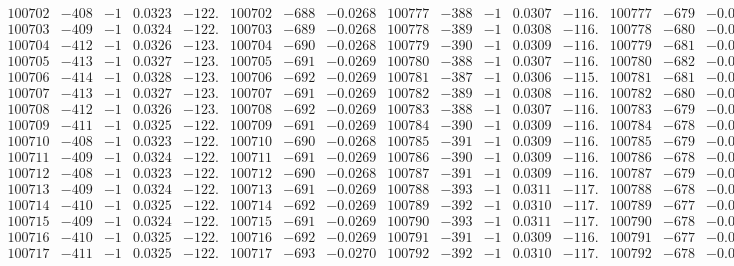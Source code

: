 \documentclass[11pt,reqno,a4letter]{article}
\numberwithin{figure}{section}
\numberwithin{table}{section}
\theoremstyle{plain}
\numberwithin{theorem}{section}
\theoremstyle{definition}
\begin{document}
\begin{table}[ht!]
\begin{equation*}
{\begin{array}{ccccc|ccc||ccccc|ccc}
100702 & -408 & -1 & 0.0323 & -122. & 100702 & -688 & -0.0268 & 100777 & -388 & -1 & 0.0307 & -116. & 100777 & -679 & -0.0264  \\
100703 & -409 & -1 & 0.0324 & -122. & 100703 & -689 & -0.0268 & 100778 & -389 & -1 & 0.0308 & -116. & 100778 & -680 & -0.0264  \\
100704 & -412 & -1 & 0.0326 & -123. & 100704 & -690 & -0.0268 & 100779 & -390 & -1 & 0.0309 & -116. & 100779 & -681 & -0.0265  \\
100705 & -413 & -1 & 0.0327 & -123. & 100705 & -691 & -0.0269 & 100780 & -388 & -1 & 0.0307 & -116. & 100780 & -682 & -0.0265  \\
100706 & -414 & -1 & 0.0328 & -123. & 100706 & -692 & -0.0269 & 100781 & -387 & -1 & 0.0306 & -115. & 100781 & -681 & -0.0265  \\
100707 & -413 & -1 & 0.0327 & -123. & 100707 & -691 & -0.0269 & 100782 & -389 & -1 & 0.0308 & -116. & 100782 & -680 & -0.0264  \\
100708 & -412 & -1 & 0.0326 & -123. & 100708 & -692 & -0.0269 & 100783 & -388 & -1 & 0.0307 & -116. & 100783 & -679 & -0.0264  \\
100709 & -411 & -1 & 0.0325 & -122. & 100709 & -691 & -0.0269 & 100784 & -390 & -1 & 0.0309 & -116. & 100784 & -678 & -0.0264  \\
100710 & -408 & -1 & 0.0323 & -122. & 100710 & -690 & -0.0268 & 100785 & -391 & -1 & 0.0309 & -116. & 100785 & -679 & -0.0264  \\
100711 & -409 & -1 & 0.0324 & -122. & 100711 & -691 & -0.0269 & 100786 & -390 & -1 & 0.0309 & -116. & 100786 & -678 & -0.0264  \\
100712 & -408 & -1 & 0.0323 & -122. & 100712 & -690 & -0.0268 & 100787 & -391 & -1 & 0.0309 & -116. & 100787 & -679 & -0.0264  \\
100713 & -409 & -1 & 0.0324 & -122. & 100713 & -691 & -0.0269 & 100788 & -393 & -1 & 0.0311 & -117. & 100788 & -678 & -0.0264  \\
100714 & -410 & -1 & 0.0325 & -122. & 100714 & -692 & -0.0269 & 100789 & -392 & -1 & 0.0310 & -117. & 100789 & -677 & -0.0263  \\
100715 & -409 & -1 & 0.0324 & -122. & 100715 & -691 & -0.0269 & 100790 & -393 & -1 & 0.0311 & -117. & 100790 & -678 & -0.0264  \\
100716 & -410 & -1 & 0.0325 & -122. & 100716 & -692 & -0.0269 & 100791 & -391 & -1 & 0.0309 & -116. & 100791 & -677 & -0.0263  \\
100717 & -411 & -1 & 0.0325 & -122. & 100717 & -693 & -0.0270 & 100792 & -392 & -1 & 0.0310 & -117. & 100792 & -678 & -0.0264  \\

\end{array}}
\end{equation*}
\end{table}
\end{document}
